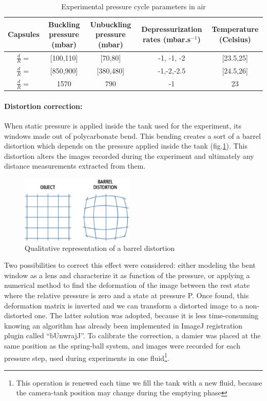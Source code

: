 \begin{table}[H]
	\centering
		\begin{adjustbox}{width=\textwidth}
			\begin{tabular}{|c|c|c|c|c|}
				\hline
				Capsules & Buckling pressure (mbar) & Unbuckling pressure (mbar) & Depressurization rates (mbar.s$^{-1}$) & Temperature (Celsius) \\
				\hline
				$\frac{d}{R} = $ & [100,110]& [70,80] & -1, -1, -2 & [23.5,25]\\
				\hline
				$\frac{d}{R} = $ & [850,900] & [380,480] & -1,-2,-2.5 & [24.5,26]\\
				\hline
				$\frac{d}{R} = $ & 1570 & 790 & -1 & 23 \\
				\hline
			\end{tabular}
		\end{adjustbox}
	\caption{Experimental pressure cycle parameters in air}
	\label{tab:Experimental_pressure_cycle_parameters_in_air}
\end{table}


\paragraph{Distortion correction:}
When static pressure is applied inside the tank used for the experiment, its windows made out of polycarbonate bend. This bending creates a sort of a barrel distortion which depends on the pressure applied inside the tank (fig.\ref{fig:barrel_distortion}). This distortion alters the images recorded during the experiment and ultimately any distance measurements extracted from them.
\begin{figure}[H] %
	\centering%
  \includegraphics[width=0.48\textwidth]{figures/Chapter_1/barrel_effect.png}
	\caption{Qualitative representation of a barrel distortion}
	\label{fig:barrel_distortion}
\end{figure}
 Two possibilities to correct this effect were considered: either modeling the bent window as a lens and characterize it as function of the pressure, or applying a numerical method to find the deformation of the image between the rest state where the relative pressure is zero and a state at pressure P. Once found, this deformation matrix is inverted and we can transform a distorted image to a non-distorted one. The latter solution was adopted, because it is less time-consuming knowing an algorithm has already been implemented in ImageJ registration plugin called "`bUnwrajJ"'.
To calibrate the correction, a damier was placed at the same position as the spring-ball system, and images were recorded for each pressure step, used during experiments in one fluid\footnote{This operation is renewed each time we fill the tank with a new fluid, because the camera-tank position may change during the emptying phase}.




